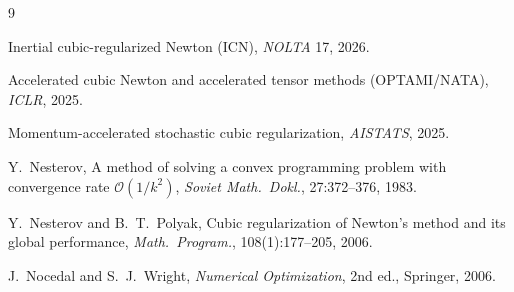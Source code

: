 \begin{thebibliography}{9}

Inertial cubic-regularized Newton (ICN), \emph{NOLTA} 17, 2026.

Accelerated cubic Newton and accelerated tensor methods (OPTAMI/NATA), \emph{ICLR}, 2025.

Momentum-accelerated stochastic cubic regularization, \emph{AISTATS}, 2025.

Y.~Nesterov, A method of solving a convex programming problem with convergence rate
$\mathcal{O}(1/k^2)$, \emph{Soviet Math.\ Dokl.}, 27:372--376, 1983.

Y.~Nesterov and B.~T.~Polyak, Cubic regularization of Newton's method and its global
performance, \emph{Math.\ Program.}, 108(1):177--205, 2006.

J.~Nocedal and S.~J.~Wright, \emph{Numerical Optimization}, 2nd ed., Springer, 2006.

\end{thebibliography}

